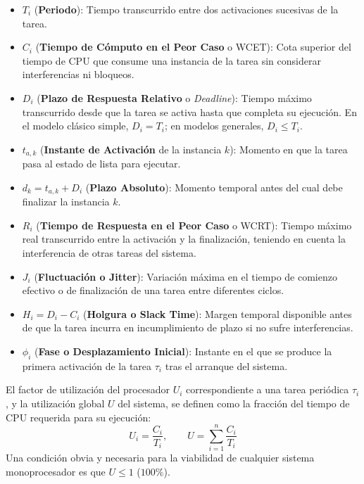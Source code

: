 \begin{itemize}[leftmargin=*]
    \item $T_i$ (\textbf{Periodo}): Tiempo transcurrido entre dos activaciones sucesivas de la tarea.
    \item $C_i$ (\textbf{Tiempo de Cómputo en el Peor Caso} o WCET): Cota superior del tiempo de CPU que consume una instancia de la tarea sin considerar interferencias ni bloqueos.
    \item $D_i$ (\textbf{Plazo de Respuesta Relativo} o \textit{Deadline}): Tiempo máximo transcurrido desde que la tarea se activa hasta que completa su ejecución. En el modelo clásico simple, $D_i = T_i$; en modelos generales, $D_i \le T_i$.
    \item $t_{a,k}$ (\textbf{Instante de Activación} de la instancia $k$): Momento en que la tarea pasa al estado de lista para ejecutar.
    \item $d_k = t_{a,k} + D_i$ (\textbf{Plazo Absoluto}): Momento temporal antes del cual debe finalizar la instancia $k$.
    \item $R_i$ (\textbf{Tiempo de Respuesta en el Peor Caso} o WCRT): Tiempo máximo real transcurrido entre la activación y la finalización, teniendo en cuenta la interferencia de otras tareas del sistema.
    \item $J_i$ (\textbf{Fluctuación o Jitter}): Variación máxima en el tiempo de comienzo efectivo o de finalización de una tarea entre diferentes ciclos.
    \item $H_i = D_i - C_i$ (\textbf{Holgura o Slack Time}): Margen temporal disponible antes de que la tarea incurra en incumplimiento de plazo si no sufre interferencias.
    \item $\phi_i$ (\textbf{Fase o Desplazamiento Inicial}): Instante en el que se produce la primera activación de la tarea $\tau_i$ tras el arranque del sistema.
\end{itemize}

\begin{definicion}
El factor de utilización del procesador $U_i$ correspondiente a una tarea periódica $\tau_i$, y la utilización global $U$ del sistema, se definen como la fracción del tiempo de CPU requerida para su ejecución:
\begin{equation}
U_i = \frac{C_i}{T_i}, \qquad U = \sum_{i=1}^n \frac{C_i}{T_i}
\end{equation}
Una condición obvia y necesaria para la viabilidad de cualquier sistema monoprocesador es que $U \le 1$ ($100\%$).
\end{definicion}

